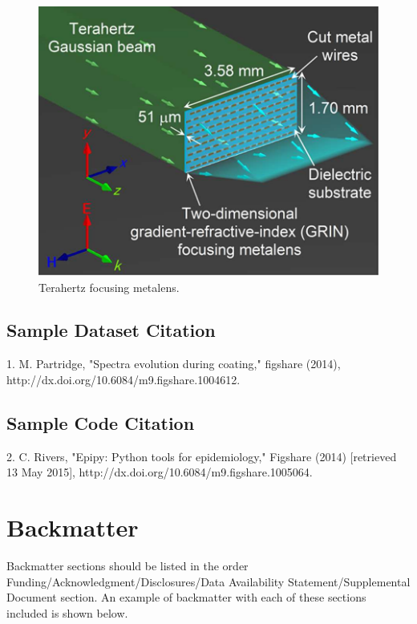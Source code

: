 \documentclass[9pt,twocolumn,twoside]{opticajnl}
\begin{document}
\begin{figure}[ht!]
\centering\includegraphics{opticafig2}
\caption{Terahertz focusing metalens.}
\end{figure}


\subsection{Sample Dataset Citation}

1. M. Partridge, "Spectra evolution during coating," figshare (2014), http://dx.doi.org/10.6084/m9.figshare.1004612.

\subsection{Sample Code Citation}

2. C. Rivers, "Epipy: Python tools for epidemiology," Figshare (2014) [retrieved 13 May 2015], http://dx.doi.org/10.6084/m9.figshare.1005064.

\section{Backmatter}
Backmatter sections should be listed in the order Funding/Acknowledgment/Disclosures/Data Availability Statement/Supplemental Document section. An example of backmatter with each of these sections included is shown below.
\end{document}
